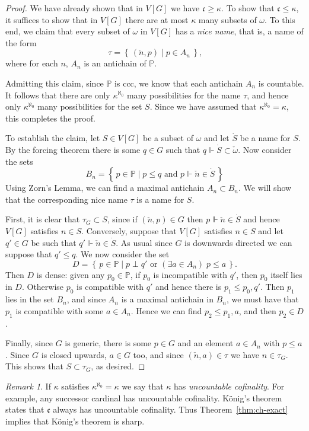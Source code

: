 \documentclass[11pt,oneside]{amsbook}
\newcommand{\set}[1]{\left\{\,#1\,\right\}}
\newcommand{\PP}{\mathbb P}
\newcommand{\forces}{\Vdash}
\theoremstyle{definition}
\theoremstyle{plain}
\theoremstyle{definition}
\theoremstyle{remark}
\newtheorem{rem}[thm]{Remark}
\numberwithin{equation}{section}
\numberwithin{figure}{section}
\begin{document}
\begin{proof}
  We have already shown that in $V[G]$ we have $\mathfrak c\geq\kappa$. To show that $\mathfrak c\leq\kappa$, it suffices to show that in $V[G]$ there are at most $\kappa$ many subsets of $\omega$. To this end, we claim that every subset of $\omega$ in $V[G]$ has a \emph{nice name}, that is, a name of the form
  \[\tau=\set{(\check n,p)\mid p\in A_n}\text{,}
  \]
  where for each $n$, $A_n$ is an antichain of $\PP$.

  Admitting this claim, since $\PP$ is ccc, we know that each antichain $A_n$ is countable. It follows that there are only $\kappa^{\aleph_0}$ many possibilities for the name $\tau$, and hence only $\kappa^{\aleph_0}$ many possibilities for the set $S$. Since we have assumed that $\kappa^{\aleph_0}=\kappa$, this completes the proof.

  To establish the claim, let $S\in V[G]$ be a subset of $\omega$ and let $\dot S$ be a name for $S$. By the forcing theorem there is some $q\in G$ such that $q\forces\dot S\subset\check\omega$. Now consider the sets
  \[B_n=\set{p\in\PP\mid p\leq q\text{ and }p\forces\check n\in\dot S}
  \]
  Using Zorn's Lemma, we can find a maximal antichain $A_n\subset B_n$. We will show that the corresponding nice name $\tau$ is a name for $S$.

  First, it is clear that $\tau_G\subset S$, since if $(\check n,p)\in G$ then $p\forces\check n\in\dot S$ and hence $V[G]$ satisfies $n\in S$. Conversely, suppose that $V[G]$ satisfies $n\in S$ and let $q'\in G$ be such that $q'\forces\check n\in\dot S$. As usual since $G$ is downwards directed we can suppose that $q'\leq q$. We now consider the set
  \[D=\set{p\in\PP\mid p\perp q'\text{ or }(\exists a\in A_n)\;p\leq a}\text{.}
  \]
  Then $D$ is dense: given any $p_0\in\PP$, if $p_0$ is incompatible with $q'$, then $p_0$ itself lies in $D$. Otherwise $p_0$ is compatible with $q'$ and hence there is $p_1\leq p_0,q'$. Then $p_1$ lies in the set $B_n$, and since $A_n$ is a maximal antichain in $B_n$, we must have that $p_1$ is compatible with some $a\in A_n$. Hence we can find $p_2\leq p_1,a$, and then $p_2\in D$.

  Finally, since $G$ is generic, there is some $p\in G$ and an element $a\in A_n$ with $p\leq a$. Since $G$ is closed upwards, $a\in G$ too, and since $(\check n,a)\in\tau$ we have $n\in\tau_G$. This shows that $S\subset\tau_G$, as desired.
\end{proof}

\begin{rem}
  If $\kappa$ satisfies $\kappa^{\aleph_0}=\kappa$ we say that $\kappa$ has \emph{uncountable cofinality}. For example, any successor cardinal has uncountable cofinality. K\"onig's theorem states that $\mathfrak c$ always has uncountable cofinality. Thus Theorem~\ref{thm:ch-exact} implies that K\"onig's theorem is sharp.
\end{rem}
\end{document}
